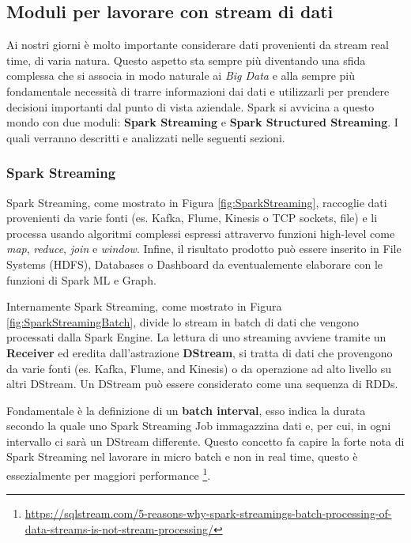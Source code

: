 \documentclass[12pt,italian]{article}
\begin{document}
\subsection{Moduli per lavorare con stream di dati}
Ai nostri giorni è molto importante considerare dati provenienti da stream real time, di varia natura. Questo aspetto sta sempre più diventando una sfida complessa che si associa in modo naturale ai \textit{Big Data} e alla sempre più fondamentale necessità di trarre informazioni dai dati e utilizzarli per prendere decisioni importanti dal punto di vista aziendale. \newline
Spark si avvicina a questo mondo con due moduli: \textbf{Spark Streaming} e \textbf{Spark Structured Streaming}. I quali verranno descritti e analizzati nelle seguenti sezioni.
\subsubsection{Spark Streaming}
Spark Streaming, come mostrato in Figura \ref{fig:SparkStreaming}, raccoglie dati provenienti da varie fonti (es. Kafka, Flume, Kinesis o TCP sockets, file) e li processa usando algoritmi complessi espressi attravervo funzioni high-level come \textit{map}, \textit{reduce}, \textit{join} e \textit{window}. Infine, il risultato prodotto può essere inserito in File Systems (HDFS), Databases o Dashboard da eventualemente elaborare con le funzioni di Spark ML e Graph.

\par Internamente Spark Streaming, come mostrato in  Figura \ref{fig:SparkStreamingBatch}, divide lo stream in batch di dati che vengono processati dalla Spark Engine.
\newline
La lettura di uno streaming avviene tramite un \textbf{Receiver} ed eredita dall'astrazione \textbf{DStream}, si tratta di dati che provengono da varie fonti (es. Kafka, Flume, and Kinesis) o da operazione ad alto livello su altri DStream.
Un DStream può essere considerato come una sequenza di RDDs.

Fondamentale è la definizione di un \textbf{batch interval}, esso indica la durata secondo la quale uno Spark Streaming Job immagazzina dati e, per cui, in ogni intervallo ci sarà un DStream differente.
Questo concetto fa capire la forte nota di Spark Streaming nel lavorare in micro batch e non in real time, questo è essezialmente per maggiori performance \footnote{\url{https://sqlstream.com/5-reasons-why-spark-streamings-batch-processing-of-data-streams-is-not-stream-processing/}}. %
\end{document}
